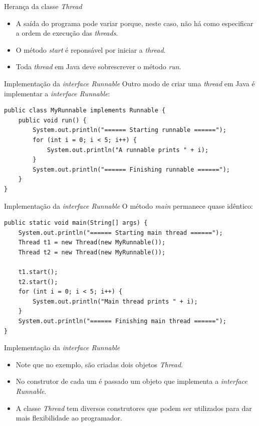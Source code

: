 \documentclass[11pt,justified]{beamer}
\begin{document}
\begin{frame}{Herança da classe \textit{Thread}}
    \begin{itemize}
        \item A saída do programa pode variar porque, neste caso, não há como especificar a ordem de execução das \textit{threads}.
        \item O método \textit{start} é reponsável por iniciar a \textit{thread}.
        \item Toda \textit{thread} em Java deve sobrescrever o método \textit{run}.
    \end{itemize}
\end{frame}

\begin{frame}[fragile]{Implementação da \textit{interface Runnable}}
    Outro modo de criar uma \textit{thread} em Java é implementar a \textit{interface Runnable}:
    \begin{lstlisting}
public class MyRunnable implements Runnable {
    public void run() {
        System.out.println("====== Starting runnable ======");
        for (int i = 0; i < 5; i++) {
            System.out.println("A runnable prints " + i);
        }
        System.out.println("====== Finishing runnable ======");
    }
}
    \end{lstlisting}
\end{frame}

\begin{frame}[fragile]{Implementação da \textit{interface Runnable}}
    O método \textit{main} permanece quase idêntico:
    \begin{lstlisting}
public static void main(String[] args) {
    System.out.println("====== Starting main thread ======");
    Thread t1 = new Thread(new MyRunnable());
    Thread t2 = new Thread(new MyRunnable());
    
    t1.start();
    t2.start();
    for (int i = 0; i < 5; i++) {
        System.out.println("Main thread prints " + i);
    }
    System.out.println("====== Finishing main thread ======");
}
    \end{lstlisting}
\end{frame}

\begin{frame}{Implementação da \textit{interface Runnable}}
    \begin{itemize}
        \item Note que no exemplo, são criadas dois objetos \textit{Thread}.
        \item No construtor de cada um é passado um objeto que implementa a \textit{interface Runnable}.
        \item A classe \textit{Thread} tem diversos construtores que podem ser utilizados para dar mais flexibilidade ao programador.
    \end{itemize}
\end{frame}
\end{document}
